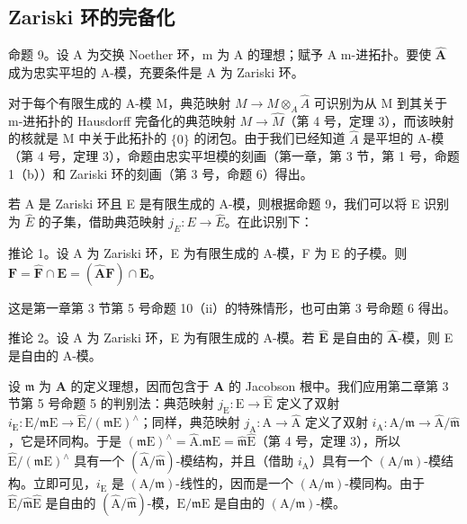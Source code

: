 \subsection{Zariski 环的完备化}

命题 9。设 A 为交换 Noether 环，m 为 A 的理想；赋予 A m-进拓扑。要使 \(\hat{\mathbf{A}}\) 成为忠实平坦的 A-模，充要条件是 A 为 Zariski 环。

对于每个有限生成的 A-模 M，典范映射 \(M \to M \otimes_{A} \hat{A}\) 可识别为从 M 到其关于 m-进拓扑的 Hausdorff 完备化的典范映射 \(M \to \hat{M}\)（第 4 号，定理 3），而该映射的核就是 M 中关于此拓扑的 \(\{0\}\) 的闭包。由于我们已经知道 \(\hat{A}\) 是平坦的 A-模（第 4 号，定理 3），命题由忠实平坦模的刻画（第一章，第 3 节，第 1 号，命题 1（b））和 Zariski 环的刻画（第 3 号，命题 6）得出。

若 A 是 Zariski 环且 E 是有限生成的 A-模，则根据命题 9，我们可以将 E 识别为 \(\hat{E}\) 的子集，借助典范映射 \(j_{E}: E \to \hat{E}\)。在此识别下：

推论 1。设 A 为 Zariski 环，E 为有限生成的 A-模，F 为 E 的子模。则 \(\mathbf{F} = \hat{\mathbf{F}} \cap \mathbf{E} = (\hat{\mathbf{A}}\mathbf{F}) \cap \mathbf{E}\)。

这是第一章第 3 节第 5 号命题 10（ii）的特殊情形，也可由第 3 号命题 6 得出。

推论 2。设 A 为 Zariski 环，E 为有限生成的 A-模。若 \(\hat{\mathbf{E}}\) 是自由的 \(\hat{\mathbf{A}}\)-模，则 E 是自由的 A-模。

设 \(\mathfrak{m}\) 为 \(\mathbf{A}\) 的定义理想，因而包含于 \(\mathbf{A}\) 的 Jacobson 根中。我们应用第二章第 3 节第 5 号命题 5 的判别法：典范映射 \(j_{\mathrm{E}}: \mathrm{E} \to \hat{\mathrm{E}}\) 定义了双射 \(i_{\mathrm{E}}: \mathrm{E} / \mathfrak{m}\mathrm{E} \to \hat{\mathrm{E}} / (\mathfrak{m}\mathrm{E})^{\wedge}\)；同样，典范映射 \(j_{\mathrm{A}}: \mathrm{A} \to \hat{\mathrm{A}}\) 定义了双射 \(i_{\mathrm{A}}: \mathrm{A} / \mathfrak{m} \to \hat{\mathrm{A}} / \hat{\mathfrak{m}}\)，它是环同构。于是 \((\mathfrak{m}\mathrm{E})^{\wedge} = \hat{\mathrm{A}}. \mathfrak{m}\mathrm{E} = \hat{\mathfrak{m}}\hat{\mathrm{E}}\)（第 4 号，定理 3），所以 \(\hat{\mathrm{E}} / (\mathfrak{m}\mathrm{E})^{\wedge}\) 具有一个 \((\hat{\mathrm{A}} / \hat{\mathfrak{m}})\)-模结构，并且（借助 \(i_{\mathrm{A}}\)）具有一个 \((\mathrm{A} / \mathfrak{m})\)-模结构。立即可见，\(i_{\mathrm{E}}\) 是 \((\mathrm{A} / \mathfrak{m})\)-线性的，因而是一个 \((\mathrm{A} / \mathfrak{m})\)-模同构。由于 \(\hat{\mathrm{E}} / \hat{\mathfrak{m}}\hat{\mathrm{E}}\) 是自由的 \((\hat{\mathrm{A}} / \hat{\mathfrak{m}})\)-模，\(\mathrm{E} / \mathfrak{m}\mathrm{E}\) 是自由的 \((\mathrm{A} / \mathfrak{m})\)-模。

